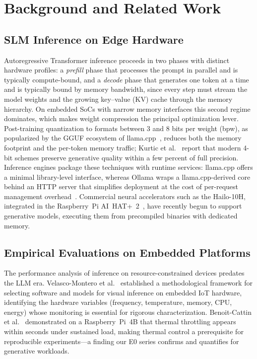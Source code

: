 \documentclass[acmsmall,natbib=false]{acmart}
\begin{document}
\section{Background and Related Work}\label{sec:related}

\subsection{SLM Inference on Edge Hardware}

Autoregressive Transformer inference proceeds in two phases with distinct
hardware profiles: a \emph{prefill} phase that processes the prompt in
parallel and is typically compute-bound, and a \emph{decode} phase that
generates one token at a time and is typically bound by memory bandwidth,
since every step must stream the model weights and the growing key--value (KV)
cache through the memory hierarchy. On embedded SoCs with narrow memory
interfaces this second regime dominates, which makes weight compression the
principal optimization lever. Post-training quantization to formats between 3
and 8 bits per weight (bpw), as popularized by the GGUF ecosystem of
llama.cpp~\cite{gerganov_llamacpp_2023,ggml-org_gguf}, reduces both the
memory footprint and the per-token memory traffic; Kurtic et
al.~\cite{kurtic_give_2025} report that modern 4-bit schemes preserve
generative quality within a few percent of full precision. Inference engines
package these techniques with runtime services: llama.cpp offers a minimal
library-level interface, whereas Ollama wraps a llama.cpp-derived core behind
an HTTP server that simplifies deployment at the cost of per-request
management overhead~\cite{ollama_2023,Github_Issue_Ollama}. Commercial neural
accelerators such as the Hailo-10H, integrated in the Raspberry~Pi
AI~HAT+~2~\cite{raspberrypi_ai_hat_plus_2_product_brief}, have recently begun
to support generative models, executing them from precompiled binaries with
dedicated memory.

\subsection{Empirical Evaluations on Embedded Platforms}

The performance analysis of inference on resource-constrained devices
predates the LLM era. Velasco-Montero et
al.~\cite{velasco-montero_optimal_2022,velasco-montero_relevant_2022}
established a methodological framework for selecting software and models for
visual inference on embedded IoT hardware, identifying the hardware variables
(frequency, temperature, memory, CPU, energy) whose monitoring is essential
for rigorous characterization. Benoit-Cattin et
al.~\cite{benoit-cattin_impact_2020} demonstrated on a Raspberry~Pi~4B that
thermal throttling appears within seconds under sustained load, making
thermal control a prerequisite for reproducible experiments---a finding our
E0 series confirms and quantifies for generative workloads.
\end{document}
